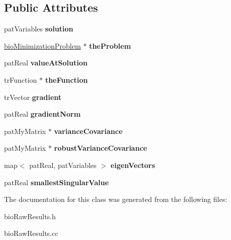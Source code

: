 \subsection*{Public Attributes}
\begin{DoxyCompactItemize}
\item 
\mbox{\label{classbio_raw_results_a4a760e6c99eb341fa848d81a22bc703d}} 
pat\+Variables {\bfseries solution}
\item 
\mbox{\label{classbio_raw_results_a34155496e6807148e75c1cbfee80acaf}} 
\hyperlink{classbio_minimization_problem}{bio\+Minimization\+Problem} $\ast$ {\bfseries the\+Problem}
\item 
\mbox{\label{classbio_raw_results_a984310d68feb4c3054411b5b60d8a8c8}} 
pat\+Real {\bfseries value\+At\+Solution}
\item 
\mbox{\label{classbio_raw_results_a896ecd5084199d80e224d57b0c136eea}} 
tr\+Function $\ast$ {\bfseries the\+Function}
\item 
\mbox{\label{classbio_raw_results_a2e5f182f5defce8c09d172b0c514562a}} 
tr\+Vector {\bfseries gradient}
\item 
\mbox{\label{classbio_raw_results_a7de00885aad30bc177b23f7e698016b1}} 
pat\+Real {\bfseries gradient\+Norm}
\item 
\mbox{\label{classbio_raw_results_aeaabef1cd53f45775eab32e188f3ad47}} 
pat\+My\+Matrix $\ast$ {\bfseries variance\+Covariance}
\item 
\mbox{\label{classbio_raw_results_a632487f83be0e69e8067df17f1a1750a}} 
pat\+My\+Matrix $\ast$ {\bfseries robust\+Variance\+Covariance}
\item 
\mbox{\label{classbio_raw_results_a270638566811b5232305643978da5dbc}} 
map$<$ pat\+Real, pat\+Variables $>$ {\bfseries eigen\+Vectors}
\item 
\mbox{\label{classbio_raw_results_a806ab770cdaf9e0d6f6e09e3dc69894e}} 
pat\+Real {\bfseries smallest\+Singular\+Value}
\end{DoxyCompactItemize}


The documentation for this class was generated from the following files\+:\begin{DoxyCompactItemize}
\item 
bio\+Raw\+Results.\+h\item 
bio\+Raw\+Results.\+cc\end{DoxyCompactItemize}
